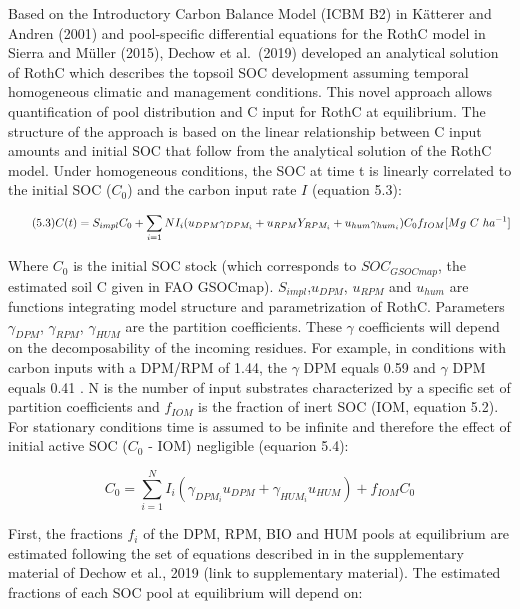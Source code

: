 \documentclass[
  10pt,
  b5paper,
]{book}
\begin{document}
Based on the Introductory Carbon Balance Model (ICBM B2) in Kätterer and Andren (2001) and pool-specific differential equations for the RothC model in Sierra and Müller (2015), Dechow et al.~(2019) developed an analytical solution of RothC which describes the topsoil SOC development assuming temporal homogeneous climatic and management conditions. This novel approach allows quantification of pool distribution and C input for RothC at equilibrium. The structure of the approach is based on the linear relationship between C input amounts and initial SOC that follow from the analytical solution of the RothC model.
Under homogeneous conditions, the SOC at time t is linearly correlated to the initial SOC (\(C_0\)) and the carbon input rate \(I\) (equation 5.3):

\begin{equation}
\tag{5.3}
C(t)=S_{impl}C_0 + \sum_{i=1}{N} I_i (u_{DPM}   \gamma_{DPM_i} + u_{RPM}Y_{RPM_i}+u_{hum}   \gamma_{hum_i}) \\ 
C_0 f_{IOM}[Mg \ C \ ha^{-1}]                                           
\end{equation}

Where \(C_0\) is the initial SOC stock (which corresponds to \(SOC_{GSOCmap}\), the estimated soil C given in FAO GSOCmap). \(S_{impl}\),\(u_{DPM}\), \(u_{RPM}\) and \(u_{hum}\) are functions integrating model structure and parametrization of RothC. Parameters \(\gamma_{DPM}\), \(\gamma_{RPM}\), \(\gamma_{HUM}\) are the partition coefficients. These \(\gamma\) coefficients will depend on the decomposability of the incoming residues. For example, in conditions with carbon inputs with a DPM/RPM of 1.44, the \(\gamma\) DPM equals 0.59 and \(\gamma\) DPM equals 0.41 . N is the number of input substrates characterized by a specific set of partition coefficients and \(f_{IOM}\) is the fraction of inert SOC (IOM, equation 5.2). For stationary conditions time is assumed to be infinite and therefore the effect of initial active SOC (\(C_0\) - IOM) negligible (equarion 5.4):

\begin{equation}
\tag{5.4}
C_0 = \sum_{i=1}^{N} I_i (\gamma_{DPM_i}u_{DPM}+\gamma_{HUM_i}u_{HUM})+f_{IOM}C_0
\end{equation}

First, the fractions \(f_i\) of the DPM, RPM, BIO and HUM pools at equilibrium are estimated following the set of equations described in in the supplementary material of Dechow et al., 2019 (link to supplementary material). The estimated fractions of each SOC pool at equilibrium will depend on:
\end{document}
